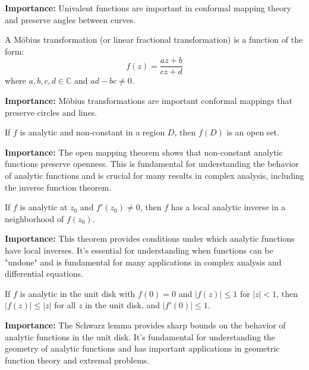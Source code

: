 \noindent\textbf{Importance:} Univalent functions are important in conformal mapping theory and preserve angles between curves.

\begin{definition}
A Möbius transformation (or linear fractional transformation) is a function of the form:
\[f(z) = \frac{az + b}{cz + d}\]
where $a, b, c, d \in \mathbb{C}$ and $ad - bc \neq 0$.
\end{definition}

\noindent\textbf{Importance:} Möbius transformations are important conformal mappings that preserve circles and lines.

\begin{theorem}
If $f$ is analytic and non-constant in a region $D$, then $f(D)$ is an open set.
\end{theorem}

\noindent\textbf{Importance:} The open mapping theorem shows that non-constant analytic functions preserve openness. This is fundamental for understanding the behavior of analytic functions and is crucial for many results in complex analysis, including the inverse function theorem.



\begin{theorem}
If $f$ is analytic at $z_0$ and $f'(z_0) \neq 0$, then $f$ has a local analytic inverse in a neighborhood of $f(z_0)$.
\end{theorem}

\noindent\textbf{Importance:} This theorem provides conditions under which analytic functions have local inverses. It's essential for understanding when functions can be "undone" and is fundamental for many applications in complex analysis and differential equations.



\begin{theorem}
If $f$ is analytic in the unit disk with $f(0) = 0$ and $|f(z)| \leq 1$ for $|z| < 1$, then $|f(z)| \leq |z|$ for all $z$ in the unit disk, and $|f'(0)| \leq 1$.
\end{theorem}

\noindent\textbf{Importance:} The Schwarz lemma provides sharp bounds on the behavior of analytic functions in the unit disk. It's fundamental for understanding the geometry of analytic functions and has important applications in geometric function theory and extremal problems.





